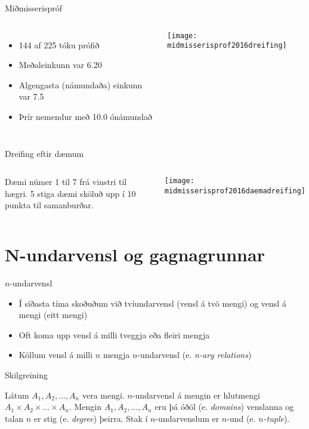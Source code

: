 \documentclass{beamer}
\begin{document}
\begin{frame}{Miðmisserispróf}
\begin{columns}
\begin{itemize}
 \item 144 af 225 tóku prófið
 \item Meðaleinkunn var 6.20
 \item Algengasta (námundaða) einkunn var 7.5
 \item Þrír nemendur með 10.0 ónámundað
\end{itemize}
\begin{center}
\texttt{[image: midmisserisprof2016dreifing]}
\end{center}
\end{columns}
\end{frame}


\begin{frame}{Dreifing eftir dæmum}
\begin{columns}
Dæmi númer 1 til 7 frá vinstri til hægri. 5 stiga dæmi sköluð upp í 10 punkta til samanburðar.
\begin{center}
\texttt{[image: midmisserisprof2016daemadreifing]}
\end{center}
\end{columns}
\end{frame}

\section{N-undarvensl og gagnagrunnar}

\begin{frame}{$n$-undarvensl}
\begin{itemize}
 \item Í síðasta tíma skoðuðum við tvíundarvensl (vensl á tvö mengi) og vensl á mengi (eitt mengi)
 \item Oft koma upp vensl á milli tveggja eða fleiri mengja
 \item Köllum vensl á milli $n$ mengja $n$-undarvensl (e. \emph{n-ary relations})
\end{itemize}
\end{frame}

\begin{frame}{Skilgreining}
\begin{tcolorbox}[title=n-undarvensl]
Látum $A_1, A_2, \ldots, A_n$ vera mengi. $n$-undarvensl á mengin er hlutmengi $A_1 \times A_2 \times \ldots \times A_n$. Mengin $A_1, A_2, \ldots, A_n$ eru þá óðöl (e. \emph{domains}) venslanna og talan $n$ er stig (e. \emph{degree}) þeirra. Stak í $n$-undarvenslum er $n$-und (e. \emph{$n$-tuple}).
\end{tcolorbox}
\end{frame}
\end{document}
